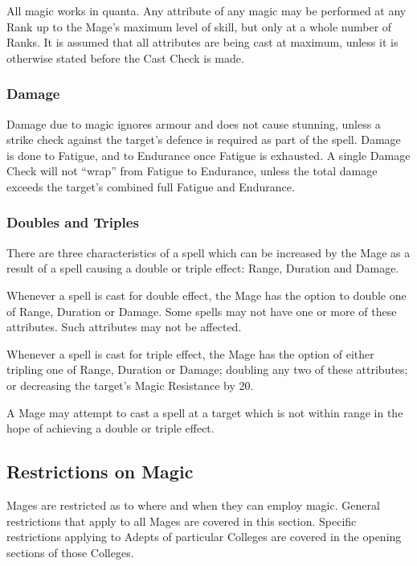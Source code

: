 \begin{multicols*}{3}
All magic works in quanta. Any attribute of any magic may be performed
at any Rank up to the Mage's maximum level of skill, but only at a
whole number of Ranks. It is assumed that all attributes are being
cast at maximum, unless it is otherwise stated before the Cast Check
is made.

\subsubsection{Damage}

Damage due to magic ignores armour and does not cause stunning, unless
a strike check against the target's defence is required as part of the
spell. Damage is done to Fatigue, and to Endurance once Fatigue is
exhausted. A single Damage Check will not ``wrap'' from Fatigue to
Endurance, unless the total damage exceeds the target's combined full
Fatigue and Endurance.

\subsubsection{Doubles and Triples}

There are three characteristics of a spell which can be increased by
the Mage as a result of a spell causing a double or triple effect:
Range, Duration and Damage.

Whenever a spell is cast for double effect, the Mage has the option to
double one of Range, Duration or Damage. Some spells may not have one
or more of these attributes. Such attributes may not be affected.

Whenever a spell is cast for triple effect, the Mage has the option of
either tripling one of Range, Duration or Damage; doubling any two of
these attributes; or decreasing the target's Magic Resistance by 20.

A Mage may attempt to cast a spell at a target which is not within
range in the hope of achieving a double or triple effect.

\subsection{Restrictions on Magic}
\label{magic:restrictions}

Mages are restricted as to where and when they can employ magic.
General restrictions that apply to all Mages are covered in this
section. Specific restrictions applying to Adepts of particular
Colleges are covered in the opening sections of those Colleges.


\end{multicols*}
